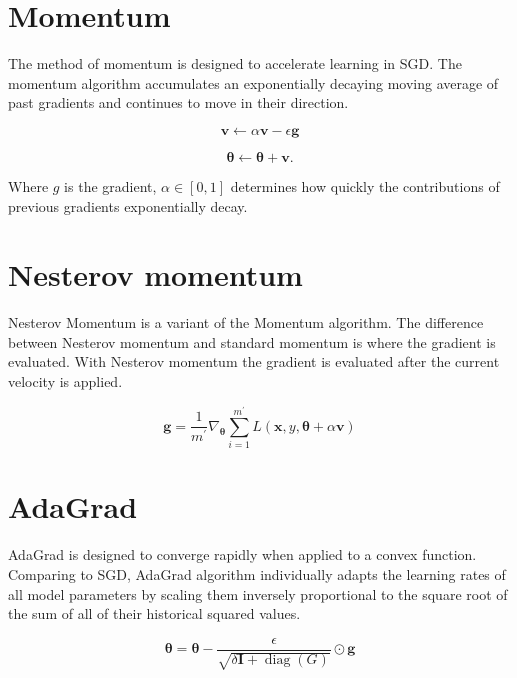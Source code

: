 \section{Momentum}
\label{sec:momentum}

The method of momentum is designed to accelerate learning in SGD.
The momentum algorithm accumulates an exponentially decaying moving average of past gradients and continues to move in their direction.


\begin{equation}
\boldsymbol{v} \leftarrow \alpha \boldsymbol{v}-\epsilon{} \boldsymbol{g}
\end{equation}

\begin{equation}
\boldsymbol{\theta} \leftarrow \boldsymbol{\theta}+\boldsymbol{v} .
\end{equation}

Where $g$ is the gradient, $\alpha \in [0,1]$ determines how quickly the contributions of previous gradients exponentially decay.

\section{Nesterov momentum}
\label{sec:nesterov-momentum}

Nesterov Momentum is a variant of the Momentum algorithm.
The difference between Nesterov momentum and standard momentum is where the gradient is evaluated.
With Nesterov momentum the gradient is evaluated after the current velocity is applied. 


\begin{equation}
\boldsymbol{g} = \frac{1}{m^{'}}\nabla_{\boldsymbol{\theta}} \sum_{i=1}^{m^{'}} L(\boldsymbol{x},y,\boldsymbol{\theta} + \alpha \boldsymbol{v})
\end{equation}

\section{AdaGrad}
\label{sec:adagrad}



AdaGrad is designed to converge rapidly when applied to a convex function.
Comparing to SGD, AdaGrad algorithm individually adapts the learning rates of all model parameters by scaling them inversely proportional to the square root of the sum of all of their historical squared values.

\begin{equation}
\boldsymbol{\theta}=\boldsymbol{\theta} - \frac{\epsilon}{\sqrt{\delta \boldsymbol{I}+\operatorname{diag}\left(G \right)}} \odot \boldsymbol{g}
\end{equation}

